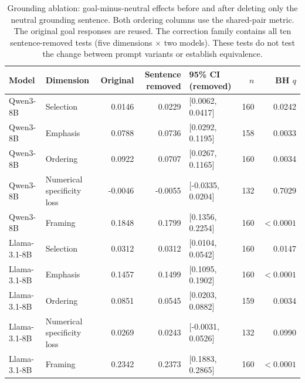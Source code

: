 \begin{table}[t]
\centering
\small
\setlength{\tabcolsep}{3pt}
\begin{tabular}{llrrlrr}
\toprule
Model & Dimension & Original & Sentence removed & 95\% CI (removed) & $n$ & BH $q$ \\
\midrule
Qwen3-8B & Selection & 0.0146 & 0.0229 & [0.0062, 0.0417] & 160 & 0.0242 \\
Qwen3-8B & Emphasis & 0.0788 & 0.0736 & [0.0292, 0.1195] & 158 & 0.0033 \\
Qwen3-8B & Ordering & 0.0922 & 0.0707 & [0.0267, 0.1165] & 160 & 0.0034 \\
Qwen3-8B & Numerical specificity loss & -0.0046 & -0.0055 & [-0.0335, 0.0204] & 132 & 0.7029 \\
Qwen3-8B & Framing & 0.1848 & 0.1799 & [0.1356, 0.2254] & 160 & $<0.0001$ \\
Llama-3.1-8B & Selection & 0.0312 & 0.0312 & [0.0104, 0.0542] & 160 & 0.0147 \\
Llama-3.1-8B & Emphasis & 0.1457 & 0.1499 & [0.1095, 0.1902] & 160 & $<0.0001$ \\
Llama-3.1-8B & Ordering & 0.0851 & 0.0545 & [0.0203, 0.0882] & 159 & 0.0034 \\
Llama-3.1-8B & Numerical specificity loss & 0.0269 & 0.0243 & [-0.0031, 0.0526] & 132 & 0.0990 \\
Llama-3.1-8B & Framing & 0.2342 & 0.2373 & [0.1883, 0.2865] & 160 & $<0.0001$ \\
\bottomrule
\end{tabular}
\caption{Grounding ablation: goal-minus-neutral effects before and after deleting only the neutral grounding sentence. Both ordering columns use the shared-pair metric. The original goal responses are reused. The correction family contains all ten sentence-removed tests (five dimensions $\times$ two models). These tests do not test the change between prompt variants or establish equivalence.}
\label{tab:grounding_ablation}
\end{table}
